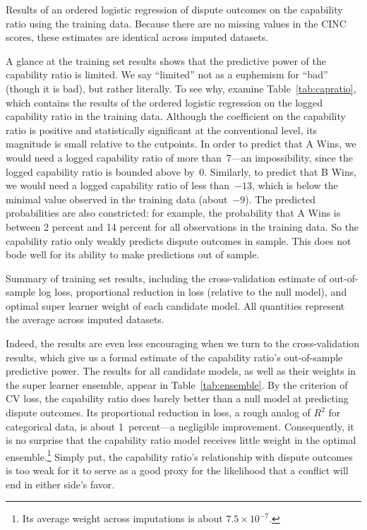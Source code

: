 \begin{table}[tp]
  \centering
  
  \caption{
    Results of an ordered logistic regression of dispute outcomes on the capability ratio using the training data.
    Because there are no missing values in the CINC scores, these estimates are identical across imputed datasets.
  }
  \label{tab:capratio}
\end{table}

A glance at the training set results shows that the predictive power of the capability ratio is limited.
We say ``limited'' not as a euphemism for ``bad'' (though it is bad), but rather literally.
To see why, examine Table~\ref{tab:capratio}, which contains the results of the ordered logistic regression on the logged capability ratio in the training data.
Although the coefficient on the capability ratio is positive and statistically significant at the conventional level, its magnitude is small relative to the cutpoints.
In order to predict that A Wins, we would need a logged capability ratio of more than~7---an impossibility, since the logged capability ratio is bounded above by~0.
Similarly, to predict that B Wins, we would need a logged capability ratio of less than~$-13$, which is below the minimal value observed in the training data (about~$-9$).
The predicted probabilities are also constricted: for example, the probability that A Wins is between 2 percent and 14 percent for all observations in the training data.
So the capability ratio only weakly predicts dispute outcomes in sample.
This does not bode well for its ability to make predictions out of sample.

\begin{table}[tp]
  \centering
  
  \caption{
    Summary of training set results, including the cross-validation estimate of out-of-sample log loss, proportional reduction in loss (relative to the null model), and optimal super learner weight of each candidate model.
    All quantities represent the average across imputed datasets.
  }
  \label{tab:ensemble}
\end{table}

Indeed, the results are even less encouraging when we turn to the cross-validation results, which give us a formal estimate of the capability ratio's out-of-sample predictive power.
The results for all candidate models, as well as their weights in the super learner ensemble, appear in Table~\ref{tab:ensemble}.
By the criterion of CV loss, the capability ratio does barely better than a null model at predicting dispute outcomes.
Its proportional reduction in loss, a rough analog of $R^2$ for categorical data, is about 1~percent---a negligible improvement.
Consequently, it is no surprise that the capability ratio model receives little weight in the optimal ensemble.\footnote{
  Its average weight across imputations is about $7.5 \times 10^{-7}$.
}
Simply put, the capability ratio's relationship with dispute outcomes is too weak for it to serve as a good proxy for the likelihood that a conflict will end in either side's favor.

